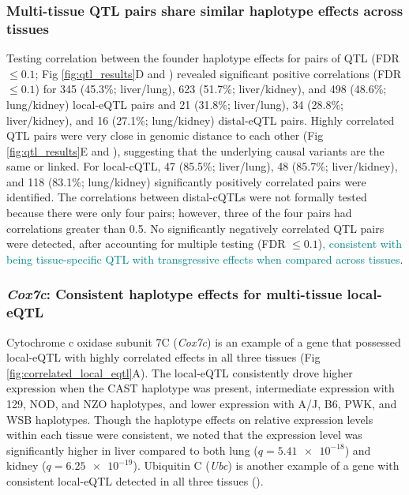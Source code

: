 \documentclass[10pt,letterpaper]{article}
\newcommand{\GKinline}[1]{\textcolor{teal}{#1}}
\begin{document}
\subsubsection*{Multi-tissue QTL pairs share similar haplotype effects across tissues}
Testing correlation between the founder haplotype effects for pairs of QTL (FDR $\le 0.1$; Fig \ref{fig:qtl_results}D and ) revealed significant positive correlations (FDR $\le 0.1$) for 345 (45.3\%; liver/lung), 623 (51.7\%; liver/kidney), and 498 (48.6\%; lung/kidney) local-eQTL pairs and 21 (31.8\%; liver/lung), 34 (28.8\%; liver/kidney), and 16 (27.1\%; lung/kidney) distal-eQTL pairs. Highly correlated QTL pairs were very close in genomic distance to each other (Fig \ref{fig:qtl_results}E and ), suggesting that the underlying causal variants are the same or linked. For local-cQTL, 47 (85.5\%; liver/lung), 48 (85.7\%; liver/kidney), and 118 (83.1\%; lung/kidney) significantly positively correlated pairs were identified. The correlations between distal-cQTLs were not formally tested because there were only four pairs; however, three of the four pairs had correlations greater than 0.5. No significantly negatively correlated QTL pairs were detected, after accounting for multiple testing (FDR $\le 0.1$)\GKinline{, consistent with being tissue-specific QTL with transgressive effects when compared across tissues}.

\subsubsection*{\textit{Cox7c}: Consistent haplotype effects for multi-tissue local-eQTL}
Cytochrome c oxidase subunit 7C (\textit{Cox7c}) is an example of a gene that possessed local-eQTL with highly correlated effects in all three tissues (Fig \ref{fig:correlated_local_eqtl}A).
The local-eQTL consistently drove higher expression when the CAST haplotype was present, intermediate expression with 129, NOD, and NZO haplotypes, and lower expression with A/J, B6, PWK, and WSB haplotypes. Though the haplotype effects on relative expression levels within each tissue were consistent, we noted that the expression level was significantly higher in liver compared to both lung ($q = \num{5.41e-18}$) and kidney ($q = \num{6.25e-19}$). Ubiquitin C (\textit{Ubc}) is another example of a gene with consistent local-eQTL detected in all three tissues ().
\end{document}
